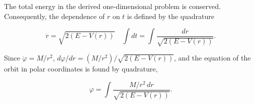 The total energy in the derived one-dimensional problem is conserved. Consequently, the dependence of $r$ on $t$ is defined by the quadrature

$$\dot{r} = \sqrt{2(E - V(r))} \quad \int dt = \int \frac{dr}{\sqrt{2(E - V(r))}}.$$

Since $\dot{\varphi} = M/r^2$, $d\varphi/dr = (M/r^2)/\sqrt{2(E - V(r))}$, and the equation of the orbit in polar coordinates is found by quadrature,

$$\varphi = \int \frac{M/r^2 \, dr}{\sqrt{2(E - V(r))}}.$$
